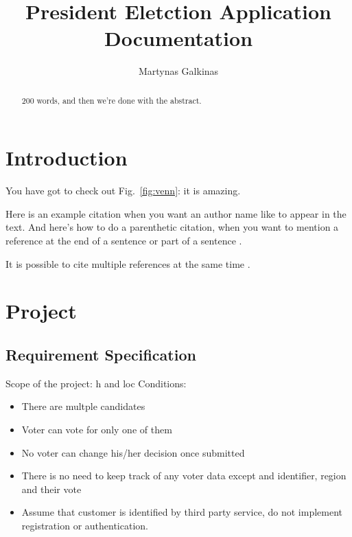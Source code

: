 \documentclass[12pt,a4paper]{article}
\title{President Eletction Application Documentation}
\author{Martynas Galkinas}
\begin{document}
\maketitle

\begin{abstract}
    200 words, and then we're done with the abstract.
\end{abstract}

\section{Introduction}\label{sec:intro}
You have got to check out Fig.~\ref{fig:venn}: it is amazing.

Here is an example citation when you want an author name like \cite{collins2011a} to appear in the text. And here's how to do a parenthetic citation, when you want to mention a reference at the end of a sentence or part of a sentence \citep{collins2013}.

It is possible to cite multiple references at the same time \citep{collins2011b,collins2016,lunn2007a,lunn2007b,ross2006,shannon1948}.

\section{Project}
\subsection{Requirement Specification}
Scope of the project: h and loc
Conditions:
\begin{itemize}
    \item
        There are multple candidates
    \item
        Voter can vote for only one of them
    \item
        No voter can change his/her decision once submitted
    \item
        There is no need to keep track of any voter data except and identifier,
        region and their vote
    \item
        Assume that customer is identified by third party service, do not
        implement registration or authentication.
\end{itemize}
\end{document}
